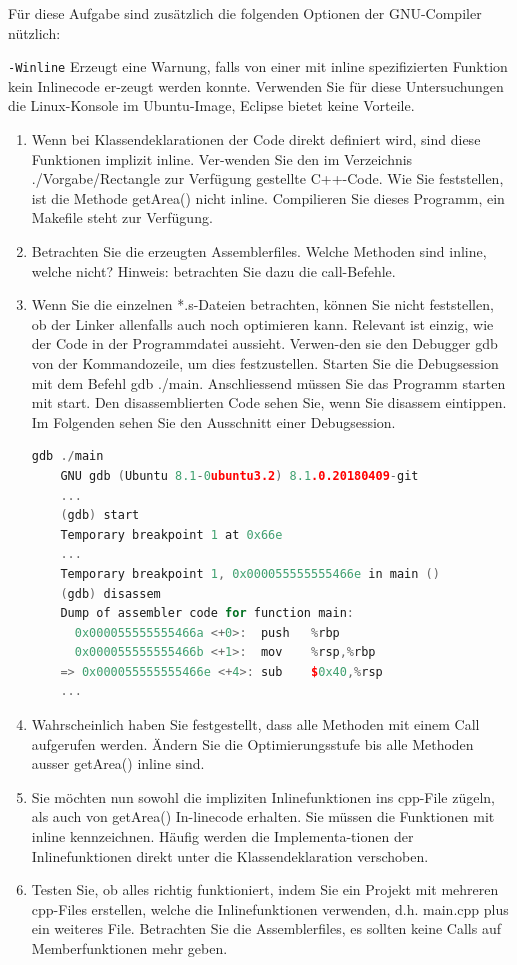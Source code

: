 Für diese Aufgabe sind zusätzlich die folgenden Optionen der GNU-Compiler nützlich:

\texttt{-Winline} Erzeugt eine Warnung, falls von einer mit inline spezifizierten Funktion kein Inlinecode er-zeugt werden konnte.
Verwenden Sie für diese Untersuchungen die Linux-Konsole im Ubuntu-Image, Eclipse bietet keine Vorteile.

\begin{enumerate}
  \item Wenn bei Klassendeklarationen der Code direkt definiert wird, sind diese Funktionen implizit inline. Ver-wenden Sie den im Verzeichnis ./Vorgabe/Rectangle zur Verfügung gestellte C++-Code. Wie Sie feststellen, ist die Methode getArea() nicht inline. Compilieren Sie dieses Programm, ein Makefile steht zur Verfügung.
  \item Betrachten Sie die erzeugten Assemblerfiles. Welche Methoden sind inline, welche nicht? Hinweis: betrachten Sie dazu die call-Befehle.
  \item Wenn Sie die einzelnen *.s-Dateien betrachten, können Sie nicht feststellen, ob der Linker allenfalls auch noch optimieren kann. Relevant ist einzig, wie der Code in der Programmdatei aussieht. Verwen-den sie den Debugger gdb von der Kommandozeile, um dies festzustellen. Starten Sie die Debugsession mit dem Befehl gdb ./main. Anschliessend müssen Sie das Programm starten mit start. Den disassemblierten Code sehen Sie, wenn Sie disassem eintippen. Im Folgenden sehen Sie den Ausschnitt einer Debugsession.

  \begin{lstlisting}[language=C++, style=C++]
  gdb ./main
    GNU gdb (Ubuntu 8.1-0ubuntu3.2) 8.1.0.20180409-git
    ...
    (gdb) start
    Temporary breakpoint 1 at 0x66e
    ...
    Temporary breakpoint 1, 0x000055555555466e in main ()
    (gdb) disassem
    Dump of assembler code for function main:
      0x000055555555466a <+0>:  push   %rbp
      0x000055555555466b <+1>:  mov    %rsp,%rbp
    => 0x000055555555466e <+4>: sub    $0x40,%rsp
    ...
  \end{lstlisting}


  \item Wahrscheinlich haben Sie festgestellt, dass alle Methoden mit einem Call aufgerufen werden. Ändern Sie die Optimierungsstufe bis alle Methoden ausser getArea() inline sind.
\item Sie möchten nun sowohl die impliziten Inlinefunktionen ins cpp-File zügeln, als auch von getArea() In-linecode erhalten. Sie müssen die Funktionen mit inline kennzeichnen. Häufig werden die Implementa-tionen der Inlinefunktionen direkt unter die Klassendeklaration verschoben.
\item Testen Sie, ob alles richtig funktioniert, indem Sie ein Projekt mit mehreren cpp-Files erstellen, welche die Inlinefunktionen verwenden, d.h. main.cpp plus ein weiteres File. Betrachten Sie die Assemblerfiles, es sollten keine Calls auf Memberfunktionen mehr geben.
\end{enumerate}

